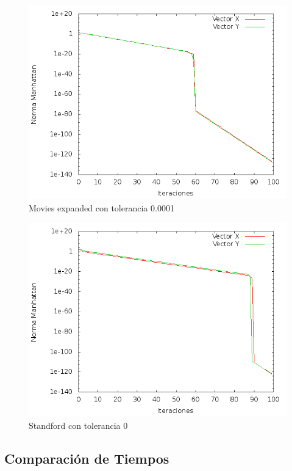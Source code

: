 \begin{figure}[!htb]
\begin{center}
    \includegraphics[scale=0.5]{imagenes/hits-movie.png}
    \caption{Movies expanded con tolerancia 0.0001}
  \end{center}
\end{figure}
\begin{figure}[!htb]
\begin{center}
    \includegraphics[scale=0.5]{imagenes/hits-stadfor.png}
    \caption{Standford con tolerancia 0}
    \end{center}
\end{figure}

\subsection{Comparación de Tiempos}

